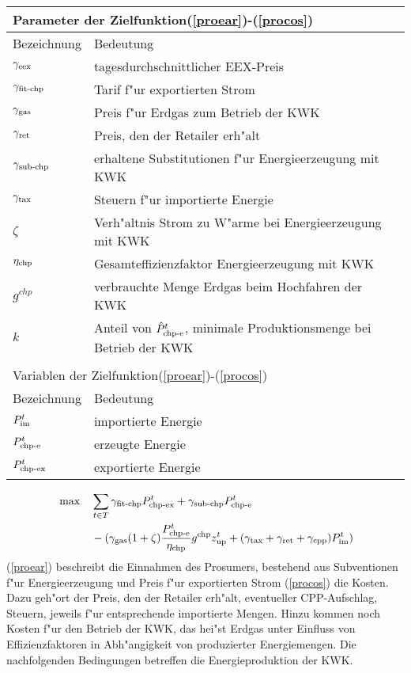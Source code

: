 \begin{tabular}{l l}
\multicolumn{2}{l}{Parameter der Zielfunktion(\ref{proear})-(\ref{procos})}\\
\hline
Bezeichnung & Bedeutung \\
\hline
$\gamma_{\text{eex}}$ & tagesdurchschnittlicher EEX-Preis  \\
$\gamma_{\text{fit-chp}}$ & Tarif f"ur exportierten Strom \\
$\gamma_{\text{gas}}$ & Preis f"ur Erdgas zum Betrieb der KWK  \\
$\gamma_{\text{ret}}$ & Preis, den der Retailer erh"alt \\
$\gamma_{\text{sub-chp}}$ & erhaltene Substitutionen f"ur Energieerzeugung mit KWK \\
$\gamma_{\text{tax}}$ & Steuern f"ur importierte Energie \\
$\zeta$ & Verh"altnis Strom zu W"arme bei Energieerzeugung mit KWK \\
$\eta_{\text{chp}}$ & Gesamteffizienzfaktor Energieerzeugung mit KWK \\
$g^{chp}$ & verbrauchte Menge Erdgas beim Hochfahren der KWK \\
$k$ & Anteil von $\hat P^t_{\text{chp-e}}$, minimale Produktionsmenge bei Betrieb der KWK  \\\\
\multicolumn{2}{l}{Variablen der Zielfunktion(\ref{proear})-(\ref{procos})}\\
\hline
Bezeichnung & Bedeutung \\
\hline
$P^t_{\text{im}}$ & importierte Energie \\
$P^t_{\text{chp-e}}$ & erzeugte Energie \\
$P^t_{\text{chp-ex}}$ & exportierte Energie
\end{tabular}
\begin{align}
\label{proear} & \max && \sum_{t \in T} \gamma_{\text{fit-chp}} P^t_{\text{chp-ex}} + \gamma_{\text{sub-chp}} P^t_{\text{chp-e}}  \\ &&& - (\gamma_{\text{gas}} (1 + \zeta) \frac{P^t_{\text{chp-e}}}{\eta_{\text{chp}}} g^{\text{chp}} z^t_{\text{up}} + (\gamma_{\text{tax}} + \gamma_{\text{ret}} + \gamma_{\text{cpp}}) P^t_{\text{im}} ) 
\label{procos}
\end{align}
(\ref{proear}) beschreibt die Einnahmen des Prosumers, bestehend aus Subventionen f"ur Energieerzeugung und Preis f"ur exportierten Strom (\ref{procos}) die Kosten. Dazu geh"ort der Preis, den der Retailer erh"alt, eventueller CPP-Aufschlag, Steuern, jeweils f"ur entsprechende importierte Mengen. Hinzu kommen noch Kosten f"ur den Betrieb der KWK, das hei"st Erdgas unter Einfluss von Effizienzfaktoren in Abh"angigkeit von produzierter Energiemengen. Die nachfolgenden Bedingungen betreffen die Energieproduktion der KWK.

